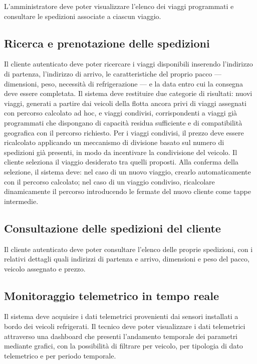 L'amministratore deve poter visualizzare l'elenco dei viaggi programmati e consultare le spedizioni associate a ciascun viaggio.

\subsection{Ricerca e prenotazione delle spedizioni}

Il cliente autenticato deve poter ricercare i viaggi disponibili inserendo l'indirizzo di partenza, l'indirizzo di arrivo, le caratteristiche del proprio pacco --- dimensioni, peso, necessità di refrigerazione --- e la data entro cui la consegna deve essere completata. 
Il sistema deve restituire due categorie di risultati: nuovi viaggi, generati a partire dai veicoli della flotta ancora privi di viaggi assegnati con percorso calcolato ad hoc, e viaggi condivisi, corrispondenti a viaggi già programmati che dispongano di capacità residua sufficiente e di compatibilità geografica con il percorso richiesto. Per i viaggi condivisi, il prezzo deve essere ricalcolato applicando un meccanismo di divisione basato sul numero di spedizioni già presenti, in modo da incentivare la condivisione del veicolo. Il cliente seleziona il viaggio desiderato tra quelli proposti. Alla conferma della selezione, il sistema deve: nel caso di un nuovo viaggio, crearlo automaticamente con il percorso calcolato; nel caso di un viaggio condiviso, ricalcolare dinamicamente il percorso introducendo le fermate del nuovo cliente come tappe intermedie.

\subsection{Consultazione delle spedizioni del cliente}

Il cliente autenticato deve poter consultare l'elenco delle proprie spedizioni, con i relativi dettagli quali indirizzi di partenza e arrivo, dimensioni e peso del pacco, veicolo assegnato e prezzo.

\subsection{Monitoraggio telemetrico in tempo reale}

Il sistema deve acquisire i dati telemetrici provenienti dai sensori installati a bordo dei veicoli refrigerati. Il tecnico deve poter visualizzare i dati telemetrici attraverso una dashboard che presenti l'andamento temporale dei parametri mediante grafici, con la possibilità di filtrare per veicolo, per tipologia di dato telemetrico e per periodo temporale.

